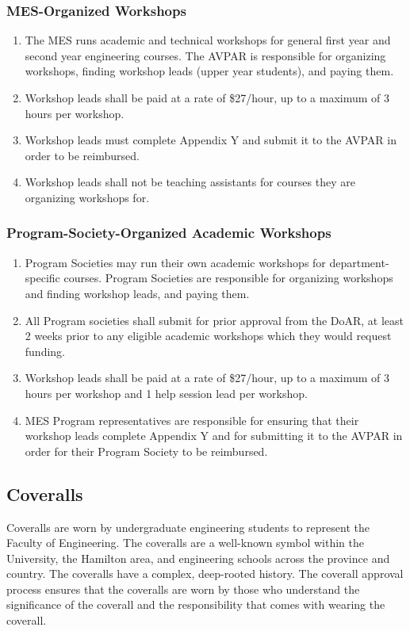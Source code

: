 \subsubsection{MES-Organized
 Workshops}
\label{mes-organized-workshops}
\begin{enumerate}
 \item
  The MES runs academic and technical workshops for general first year and second year engineering courses. The AVPAR is responsible for organizing workshops, finding workshop leads (upper year students), and paying them.
 \item
  Workshop leads shall be paid at a rate of \$27/hour, up to a maximum of 3 hours per workshop.
 \item
  Workshop leads must complete Appendix Y and submit it to the AVPAR in order to be reimbursed.
 \item 
 Workshop leads shall not be teaching assistants for courses they are organizing workshops for.
\end{enumerate}

\subsubsection{Program-Society-Organized Academic
 Workshops}
\label{program-society-organized-academic-workshops}
\begin{enumerate}
 \item
  Program Societies may run their own academic workshops for department-specific courses. Program Societies are responsible for organizing workshops and finding workshop leads, and paying them.
 \item
 All Program societies shall submit for prior approval from the DoAR, at least 2 weeks prior to any eligible academic workshops which they would request funding.
 \item
  Workshop leads shall be paid at a rate of \$27/hour, up to a maximum of 3 hours per workshop and 1 help session lead per workshop.
 \item
  MES Program representatives are responsible for ensuring that their workshop leads complete Appendix Y and for submitting it to the AVPAR in order for their Program Society to be reimbursed.
\end{enumerate}

\subsection{Coveralls}
\label{coveralls}
Coveralls are worn by undergraduate engineering students to represent
the Faculty of Engineering. The coveralls are a well-known symbol within
the University, the Hamilton area, and engineering schools across the
province and country. The coveralls have a complex, deep-rooted history.
The coverall approval process ensures that the coveralls are worn by
those who understand the significance of the coverall and the
responsibility that comes with wearing the coverall.

